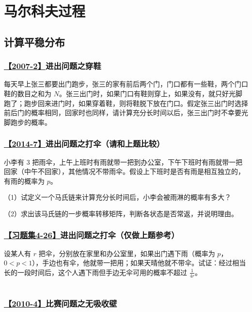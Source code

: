 \setcounter{section}{0}
\setcounter{subsection}{0}

\chapter{马尔科夫过程}

\section{计算平稳分布}

\subsection{\hyperref[A2007-2]{【2007-2】}进出问题之穿鞋} \label{Q2007-2}

每天早上张三都要出门跑步，张三的家有前后两个门，门口都有一些鞋，两个门口鞋的数目之和为 $N$。张三出门时，如果门口有鞋则穿上，如果没有，就只好光脚跑了；跑步回来进门时，如果穿着鞋，则将鞋脱下放在门口。假定张三出门时选择前后门的概率相同，回家时也同样，请计算充分长时间以后，张三出门时不幸要光脚跑步的概率。

\subsection{\hyperref[A2014-7]{【2014-7】}进出问题之打伞（请和上题比较）}\label{Q2014-7}

小李有 3 把雨伞，上午上班时有雨就带一把到办公室，下午下班时有雨就带一把回家（中午不回家），其他情况不带雨伞。假设上下班时是否有雨是相互独立的，有雨的概率为 $p$。


（1）试定义一个马氏链来计算充分长时间后，小李会被雨淋的概率有多大？

（2）求出该马氏链的一步概率转移矩阵，判断各状态是否常返，并说明理由。

\subsection{\hyperref[A4-26]{【习题集4-26】}进出问题之打伞（仅做上题参考）}\label{Q4-26}

设某人有 $r$ 把伞，分别放在家里和办公室里，如果出门遇下雨（概率为 $p$，$0<p<1$），手边也有伞，他就带一把用；如果天晴他就不带伞。试证：经过相当长的一段时间后，这个人遇下雨但手边无伞可用的概率不超过 $\frac{1}{4r}$。
\\\\
\subsection{\hyperref[A2010-4]{【2010-4】}比赛问题之无吸收壁}\label{Q2010-4}


